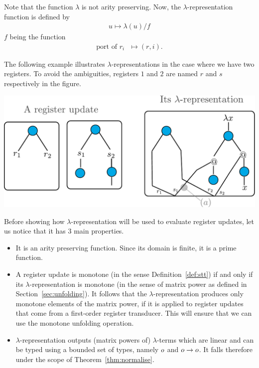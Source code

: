 Note that the function $\lambda$ is not arity preserving. Now, the $\lambda$-representation function is defined by
\begin{align*}
u \mapsto \lambda(u)/f 
\end{align*}
 $f$ being the function
 \begin{align*}
 \text{port of $r_i$ } \mapsto (r,i).
 \end{align*}


The following example illustrates $\lambda$-representations in the case where we have two registers. To avoid the ambiguities, registers $1$ and $2$ are named $r$ and $s$ respectively in the figure.
\begin{center}
\includegraphics[scale=.33]{pictures/lambda-rep}

\end{center}
Before showing how $\lambda$-representation will be used to evaluate register updates,  let us notice that it has 3 main properties.
\begin{itemize}
\item It is an arity preserving function. Since its domain is finite, it is a prime function.
\item A register update is monotone (in the sense Definition~\ref{def:stt}) if and only if its $\lambda$-representation is monotone (in the sense of matrix power as defined in  Section~\ref{sec:unfolding}). It follows that the $\lambda$-representation produces only monotone elements of the matrix power, if it is applied to register updates that come from a first-order register transducer. 
This will ensure that we can use the monotone unfolding operation. 
\item $\lambda$-representation outputs (matrix powers of) $\lambda$-terms which are  linear and can be typed using a bounded set of types, namely $o$ and $o\to o$. It falls therefore under the scope of Theorem~\ref{thm:normalise}.
\end{itemize}

